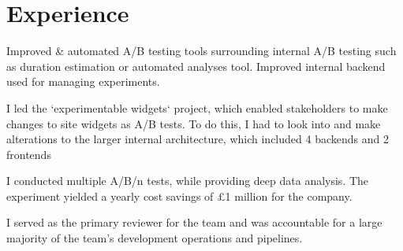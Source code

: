 \documentclass[]{CV}
\begin{document}
%
%


%
%

\begin{minipage}[t]{0.705\textwidth} 



\section{Experience}
\vspace{\topsep} %
\quad
\begin{tightemize}

\item Improved \& automated A/B testing tools surrounding internal A/B testing such as duration estimation or automated analyses tool. Improved internal backend used for managing experiments.

\item I led the `experimentable widgets` project, which enabled stakeholders to make changes to site widgets as A/B tests. To do this, I had to look into and make alterations to the larger internal architecture, which included 4 backends and 2 frontends

\item I conducted multiple A/B/n tests, while providing deep data analysis. The experiment yielded a yearly cost savings of £1 million for the company.

\item I served as the primary reviewer for the team and was accountable for a large majority of the team's development operations and pipelines.


\end{tightemize}
\end{minipage}
\end{document}
